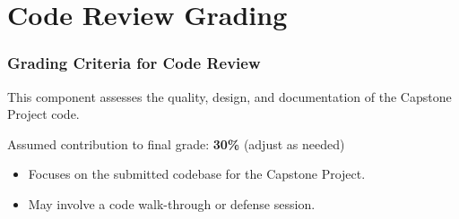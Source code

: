 \documentclass{beamer}
\begin{document}
\section{Code Review Grading}

\begin{frame}[t]
\frametitle{Grading Criteria for Code Review}
This component assesses the quality, design, and documentation of the Capstone Project code.
\vspace{1em}

Assumed contribution to final grade: \textbf{30\%} (adjust as needed)
\vspace{1em}

\begin{itemize}
    \item Focuses on the submitted codebase for the Capstone Project.
    \item May involve a code walk-through or defense session.
\end{itemize}
\end{frame}

\end{document}
